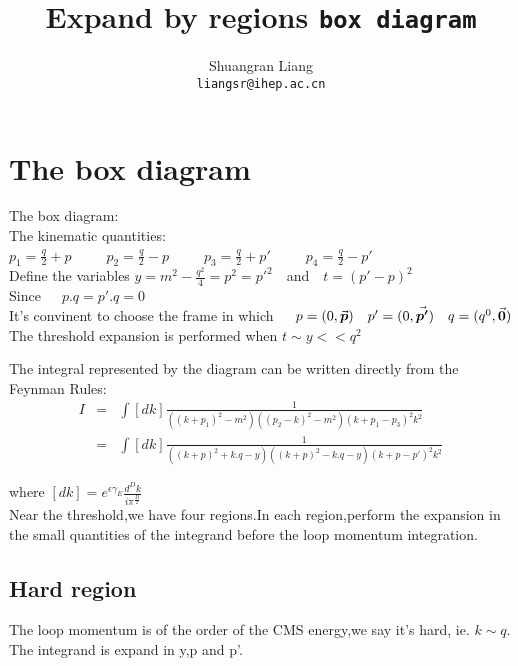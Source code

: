 \documentclass{article}
\title{Expand by regions \texttt{box diagram}}
\author{Shuangran Liang \\ \texttt{liangsr@ihep.ac.cn}}
\begin{document}
\maketitle

\tableofcontents

\section{The box diagram}
The box diagram:\\
The kinematic quantities:\\

$p_1=\frac{q}{2}+p$~~~~~$p_2=\frac{q}{2}-p$~~~~~$p_3=\frac{q}{2}+p'$~~~~~$p_4=\frac{q}{2}-p'$\\

Define the variables $y=m^2-\frac{q^2}{4}=p^2=p'^2$~~and~~$t=(p'-p)^2$\\

Since~~~$p.q=p'.q=0$\\
It's convinent to choose the frame in which~~~$p=(0,\va*{p})~~~p'=(0,\va*{p'})~~~q=(q^0,\va*{0})$\\

The threshold expansion is performed when $t\sim y<<q^2$

The integral represented by the diagram can be written directly from the Feynman Rules:\\
\begin{eqnarray}
I&=&\int[dk]\frac{1}{((k+p_1)^2-m^2)((p_2-k)^2-m^2)(k+p_1-p_3)^2k^2}\\\nonumber
&=&\int[dk]\frac{1}{((k+p)^2+k.q-y)((k+p)^2-k.q-y)(k+p-p')^2k^2}
\end{eqnarray}

where $[dk]=e^{\epsilon\gamma_{E}}\frac{d^Dk}{i\pi^\frac{D}{2}}$\\



Near the threshold,we have four regions.In each region,perform the expansion in the small quantities of the integrand before the loop momentum integration.\\

\subsection{Hard region}
The loop momentum is of the order of the CMS energy,we say it's hard, ie. $k\sim q$.   The integrand is expand in y,p and p'.
\end{document}
